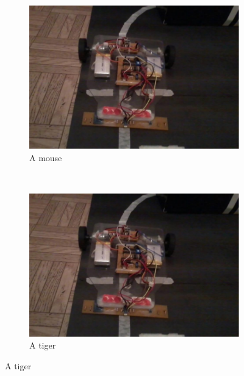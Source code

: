 \begin{figure}
    \begin{subfigure}[b]{0.3\textwidth}
        \includegraphics[width=\textwidth]{figuras/allan.png}
        \caption{A mouse}
        \label{fig:mouse}
    \end{subfigure}
    ~ %
    \begin{subfigure}[b]{0.3\textwidth}
        \includegraphics[width=\textwidth]{figuras/allan.png}
        \caption{A tiger}
        \label{fig:lalala}
    \end{subfigure}
\end{figure}


